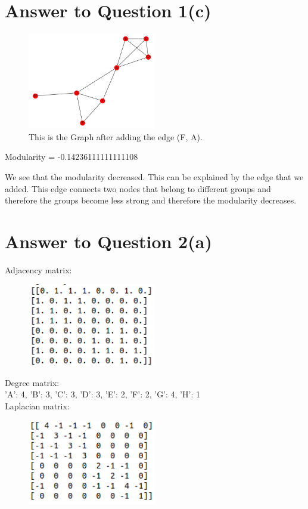 \documentclass[11pt]{article}
\begin{document}
\section*{Answer to Question 1(c)}
\begin{figure}[h]
\caption{This is the Graph after adding the edge (F, A).}
\centering
\includegraphics[width=0.5\textwidth]{./figures/G_c}
\end{figure}
Modularity =  -0.14236111111111108

We see that the modularity decreased. This can be explained by the edge that we added. This edge connects two nodes that belong to different groups and therefore the groups become less strong and therefore the modularity decreases.


\section*{Answer to Question 2(a)}
Adjacency matrix: 
\begin{figure}[h]
\centering
\includegraphics[width=0.5\textwidth]{./figures/adjacency}
\end{figure}

Degree matrix:\\
{'A': 4, 'B': 3, 'C': 3, 'D': 3, 'E': 2, 'F': 2, 'G': 4, 'H': 1}\\

Laplacian matrix: 
\begin{figure}[h]
\centering
\includegraphics[width=0.5\textwidth]{./figures/Laplacian}
\end{figure}
\end{document}
